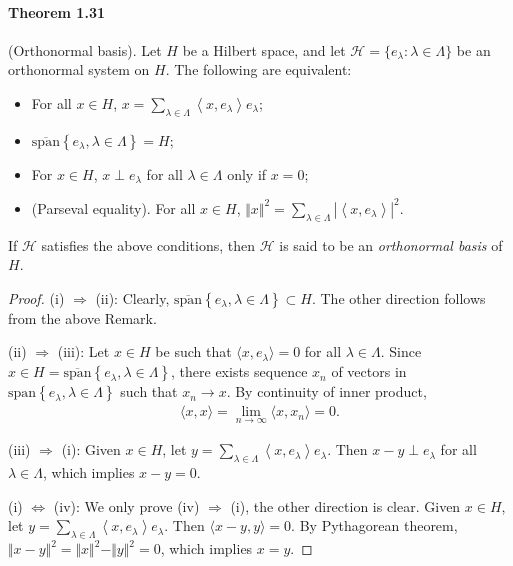 \documentclass{article}
\begin{document}
\paragraph{Theorem 1.31\label{thm:1.31}} (Orthonormal basis). Let $H$ be a Hilbert space, and let $\mathscr{H}=\{e_\lambda:\lambda\in\Lambda\}$ be an orthonormal system on $H$. The following are equivalent:
\begin{itemize}
	\item[(i)] For all $x\in H$, $x=\sum_{\lambda\in\Lambda}\left\langle x,e_\lambda\right\rangle e_\lambda$;
	\item[(ii)] $\overline{\mathrm{span}}\left\{e_\lambda,\lambda\in\Lambda\right\}=H$;
	\item[(iii)] For $x\in H$, $x\perp e_\lambda$ for all $\lambda\in\Lambda$ only if $x=0$;
	\item[(iv)] (Parseval equality). For all $x\in H$, $\Vert x\Vert^2 = \sum_{\lambda\in\Lambda}\left\vert\left\langle x,e_{\lambda}\right\rangle\right\vert^2$.
\end{itemize}
If $\mathscr{H}$ satisfies the above conditions, then $\mathscr{H}$ is said to be an \textit{orthonormal basis} of $H$.
\begin{proof}
(i) $\Rightarrow$ (ii): Clearly, $\overline{\mathrm{span}}\left\{e_\lambda,\lambda\in\Lambda\right\}\subset H$. The other direction follows from the above Remark.
\vspace{0.1cm}

(ii) $\Rightarrow$ (iii): Let $x\in H$ be such that $\langle x,e_\lambda\rangle=0$ for all $\lambda\in\Lambda$. Since $x\in H=\overline{\mathrm{span}}\left\{e_\lambda,\lambda\in\Lambda\right\}$, there exists sequence $x_n$ of vectors in $\mathrm{span}\left\{e_\lambda,\lambda\in\Lambda\right\}$ such that $x_n\to x$. By continuity of inner product,
\begin{align*}
	\langle x,x\rangle = \lim_{n\to\infty}\langle x,x_n\rangle = 0.
\end{align*}

(iii) $\Rightarrow$ (i): Given $x\in H$, let $y=\sum_{\lambda\in\Lambda}\left\langle x,e_\lambda\right\rangle e_\lambda$. Then $x-y\perp e_\lambda$ for all $\lambda\in\Lambda$, which implies $x-y=0$.
\vspace{0.1cm}

(i) $\Leftrightarrow$ (iv): We only prove (iv) $\Rightarrow$ (i), the other direction is clear. Given $x\in H$, let $y=\sum_{\lambda\in\Lambda}\left\langle x,e_\lambda\right\rangle e_\lambda$. Then $\langle x-y,y\rangle = 0$. By Pythagorean theorem, $\Vert x-y\Vert^2 = \Vert x\Vert^2 - \Vert y\Vert^2 = 0$, which implies $x=y$.
\end{proof}
\end{document}

